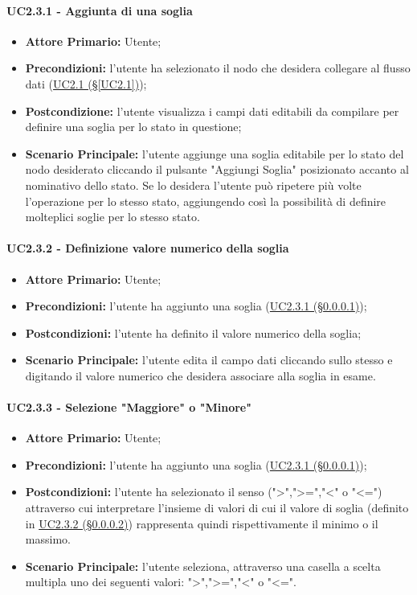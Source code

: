 \paragraph{UC2.3.1 - Aggiunta di una soglia}\label{UC2.3.1}
\begin{itemize}
	\item \textbf{Attore Primario:} Utente;
	\item \textbf{Precondizioni:} l'utente ha selezionato il nodo che desidera collegare al flusso dati 					(\hyperref[UC2.1]{UC2.1 (§\ref*{UC2.1})});
	\item \textbf{Postcondizione:} l'utente visualizza i campi dati editabili da compilare per definire una soglia per lo stato in questione;
	\item \textbf{Scenario Principale:} l'utente aggiunge una soglia editabile per lo stato del nodo desiderato cliccando il pulsante "Aggiungi Soglia" posizionato accanto al nominativo dello stato. Se lo desidera l'utente può ripetere più volte l'operazione per lo stesso stato, aggiungendo così la possibilità di definire molteplici soglie per lo stesso stato.
\end{itemize}

\paragraph{UC2.3.2 - Definizione valore numerico della soglia}\label{UC2.3.2}
\begin{itemize}
	\item \textbf{Attore Primario:} Utente;
	\item \textbf{Precondizioni:} l'utente ha aggiunto una soglia (\hyperref[UC2.3.1]{UC2.3.1 (§\ref*{UC2.3.1})});
	\item \textbf{Postcondizioni:} l'utente ha definito il valore numerico della soglia;
	\item \textbf{Scenario Principale:} l'utente edita il campo dati cliccando sullo stesso e digitando il valore numerico che desidera associare alla soglia in esame.
\end{itemize}

\paragraph{UC2.3.3 - Selezione "Maggiore" o "Minore"}\label{UC2.3.3}
\begin{itemize}
	\item \textbf{Attore Primario:} Utente;
	\item \textbf{Precondizioni:} l'utente ha aggiunto una soglia (\hyperref[UC2.3.1]{UC2.3.1 (§\ref*{UC2.3.1})});
	\item \textbf{Postcondizioni:} l'utente ha selezionato il senso (">",">=","<" o "<=") attraverso cui interpretare l'insieme di valori di cui il valore di soglia (definito in \hyperref[UC2.3.2]{UC2.3.2 (§\ref*{UC2.3.2})}) rappresenta quindi rispettivamente il minimo o il massimo.
	\item \textbf{Scenario Principale:} l'utente seleziona, attraverso una casella a scelta multipla uno dei seguenti valori: ">",">=","<" o "<=".
\end{itemize}

